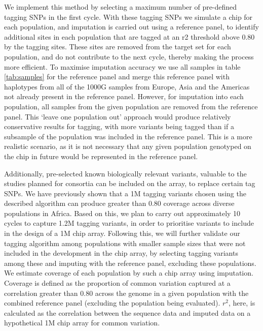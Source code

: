 

We implement this method by selecting a maximum number of pre-defined tagging \glspl{SNP} in the first cycle. With these tagging \glspl{SNP} we simulate a chip for each population, and imputation is carried out using a reference panel, to identify additional sites in each population that are tagged at an \gls{r2} threshold above 0.80 by the tagging sites. These sites are removed from the target set for each population, and do not contribute to the next cycle, thereby making the process more efficient. To maximise imputation accuracy we use all samples in table \ref{tab:samples} for the reference panel and merge this reference panel with haplotypes from all of the \gls{1000G} samples from Europe, Asia and the Americas not already present in the reference panel. However, for imputation into each population, all samples from the given population are removed from the reference panel. This ‘leave one population out’ approach would produce relatively conservative results for tagging, with more variants being tagged than if a subsample of the population was included in the reference panel. This is a more realistic scenario, as it is not necessary that any given population genotyped on the chip in future would be represented in the reference panel.

Additionally, pre-selected known biologically relevant variants, valuable to the studies planned for consortia can be included on the array, to replace certain tag \glspl{SNP}. We have previously shown that a 1M tagging variants chosen using the described algorithm can produce greater than 0.80 coverage across diverse populations in Africa. Based on this, we plan to carry out approximately 10 cycles to capture 1.2M tagging variants, in order to prioritise variants to include in the design of a 1M chip array. Following this, we will further validate our tagging algorithm among populations with smaller sample sizes that were not included in the development in the chip array, by selecting tagging variants among these and imputing with the reference panel, excluding these populations. We estimate coverage of each population by such a chip array using imputation. Coverage is defined as the proportion of common variation captured at a correlation greater than 0.80 across the genome in a given population with the combined reference panel (excluding the population being evaluated). $r^{2}$, here, is calculated as the correlation between the sequence data and imputed data on a hypothetical 1M chip array for common variation. 

